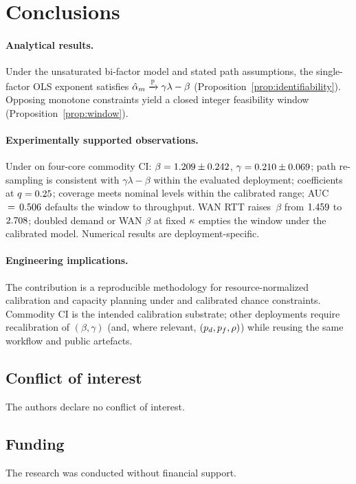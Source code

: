 \section{Conclusions}
\label{sec:conclusions}

\paragraph{Analytical results.}
Under the unsaturated bi-factor model and stated path assumptions, the
single-factor OLS exponent satisfies
$\hat{\alpha}_{m}\xrightarrow{\mathbb{P}}\gamma\lambda-\beta$
(Proposition~\ref{prop:identifiability}). Opposing monotone constraints yield a
closed integer feasibility window (Proposition~\ref{prop:window}).

\paragraph{Experimentally supported observations.}
Under \RNM{} on four-core commodity CI:
$\beta=1.209\pm0.242$, $\gamma=0.210\pm0.069$; path
re-sampling is consistent with $\gamma\lambda-\beta$ within the evaluated
deployment; coefficients at $q=0.25$; coverage meets nominal levels within the
calibrated range; AUC$\,=\,0.506$ defaults the window to throughput. WAN RTT
raises~$\beta$ from $1.459$ to $2.708$; doubled demand or
WAN $\beta$ at fixed $\kappa$ empties the window under the calibrated
model. Numerical results are deployment-specific.

\paragraph{Engineering implications.}
The contribution is a reproducible methodology for resource-normalized
calibration and capacity planning under \RNM{} and calibrated chance
constraints. Commodity CI is the intended calibration substrate; other
deployments require recalibration of $(\beta,\gamma)$ (and, where relevant,
$(p_{d},p_{f},\rho)$) while reusing the same workflow and public artefacts.

\subsection*{Conflict of interest}
The authors declare no conflict of interest.

\subsection*{Funding}
The research was conducted without financial support.

